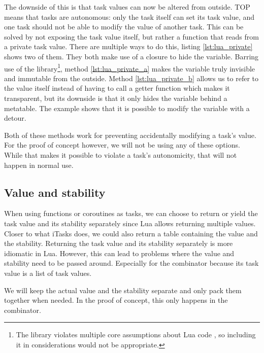 The downside of this is that task values can now be altered from outside. TOP means that tasks are autonomous: only the task itself can set its task value, and one task should not be able to modify the value of another task. This can be solved by not exposing the task value itself, but rather a function that reads from a private task value. There are multiple ways to do this, listing \ref{lst:lua_private} shows two of them. They both make use of a closure to hide the variable. Barring use of the  library\footnote{The  library violates multiple core assumptions about Lua code \cite{luareferencemanual}, so including it in considerations would not be appropriate.}, method \ref{lst:lua_private_a} makes the  variable truly invisible and immutable from the outside. Method \ref{lst:lua_private_b} allows us to refer to the value itself instead of having to call a getter function which makes it transparent, but its downside is that it only hides the  variable behind a metatable. The example shows that it is possible to modify the variable with a detour.

Both of these methods work for preventing accidentally modifying a task's value. For the proof of concept however, we will not be using any of these options. While that makes it possible to violate a task's autonomicity, that will not happen in normal use.

\subsection{Value and stability}
When using functions or coroutines as tasks, we can choose to return or yield the task value and its stability separately since Lua allows returning multiple values. Closer to what iTasks does, we could also return a table containing the value and the stability. Returning the task value and its stability separately is more idiomatic in Lua. However, this can lead to problems where the value and stability need to be passed around. Especially for the  combinator because its task value is a list of task values.

We will keep the actual value and the stability separate and only pack them together when needed. In the proof of concept, this only happens in the  combinator.
